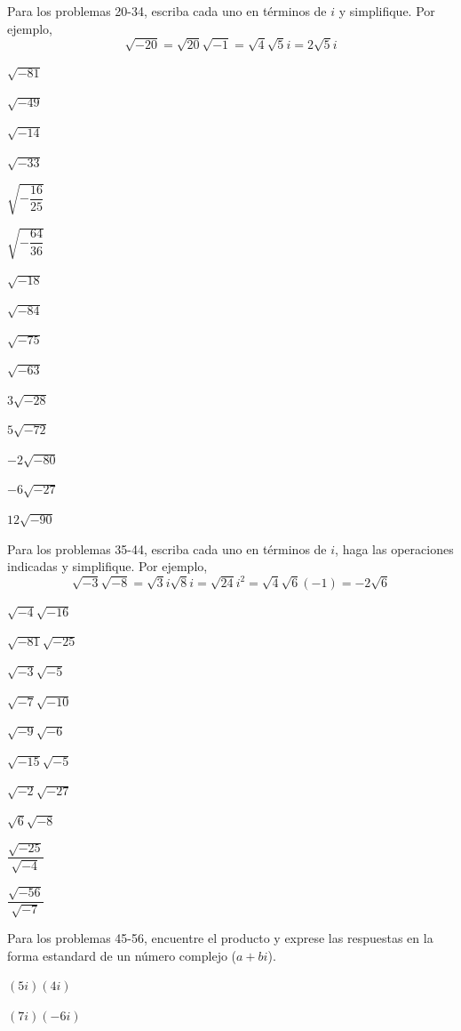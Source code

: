 \documentclass[letterpaper]{article}
\begin{document}
\begin{multicols}{2}
\begin{enumerate}
    Para los problemas 20-34, escriba cada uno en términos de $ i $ y simplifique. Por ejemplo, 
    \[ \sqrt{-20}=\sqrt{20}\sqrt{-1}=\sqrt{4}\sqrt{5}i=2\sqrt{5}i \]
    \begin{multicols}{3}
    \item $ \sqrt{-81} $ \item $ \sqrt{-49} $ \item $ \sqrt{-14} $
    \item $ \sqrt{-33} $ \item $ \sqrt{-\dfrac{16}{25}} $ \item $ \sqrt{-\dfrac{64}{36}} $
    \item $ \sqrt{-18} $ \item $ \sqrt{-84} $ \item $ \sqrt{-75} $
    \item $ \sqrt{-63} $ \item $ 3\sqrt{-28} $ \item $ 5\sqrt{-72} $
    \item $ -2\sqrt{-80} $ \item $ -6\sqrt{-27} $ \item $ 12\sqrt{-90} $
    \end{multicols}
    Para los problemas 35-44, escriba cada uno en términos de $ i $, haga las operaciones indicadas y simplifique. Por ejemplo,
    \[ \sqrt{-3}\sqrt{-8}=\sqrt{3}i\sqrt{8}i=\sqrt{24}i^2=\sqrt{4}\sqrt{6}(-1)=-2\sqrt{6} \]
    \begin{multicols}{2}
    \item $ \sqrt{-4}\sqrt{-16} $ \item $ \sqrt{-81}\sqrt{-25} $
    \item $ \sqrt{-3}\sqrt{-5} $ \item $ \sqrt{-7}\sqrt{-10} $
    \item $ \sqrt{-9}\sqrt{-6} $ \item $ \sqrt{-15}\sqrt{-5} $
    \item $ \sqrt{-2}\sqrt{-27} $ \item $ \sqrt{6}\sqrt{-8} $
    \item $ \dfrac{\sqrt{-25}}{\sqrt{-4}} $ \item $ \dfrac{\sqrt{-56}}{\sqrt{-7}} $
    \end{multicols}
    Para los problemas 45-56, encuentre el producto y exprese las respuestas en la forma estandard de un número complejo ($ a+bi $).
    \begin{multicols}{2}
      \item $ (5i)(4i) $ \item $ (7i)(-6i) $

\end{multicols}
\end{enumerate}
\end{multicols}
\end{document}
